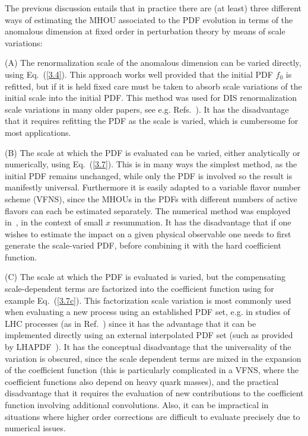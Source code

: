 The previous discussion entails that in practice there are
(at least) three different ways of estimating the MHOU associated
to the PDF evolution in terms of the anomalous dimension at fixed order in
perturbation theory by means of scale variations: 
\begin{description}
\item{(A)} The renormalization scale of the anomalous dimension can be
  varied directly, using Eq.~(\ref{3.4}).
  This approach works well provided that the
  initial PDF $f_0$ is refitted, but
  if it is held fixed care must be taken to absorb scale variations of
  the initial scale into the initial PDF.
  This method was used for DIS
  renormalization scale variations in many older papers, see
  e.g. Refs.~\cite{Martin:1990fq,Virchaux:1991jc,Ridolfi:1999vr}).
  It has the
  disadvantage that it requires refitting the PDF as the scale is varied,
  which is cumbersome for most applications.
  
\item{(B)} The scale at which the PDF is evaluated can be varied,
  either analytically or numerically, using Eq.~(\ref{3.7}). This is
  in many ways the simplest method, as the initial PDF remains
  unchanged, while only the PDF is involved so the result is
  manifestly universal.
%
  Furthermore it is easily adapted to a variable
  flavor number scheme (VFNS),
  since the MHOUs in the PDFs with different numbers of active
  flavors can each be estimated separately. The numerical method was
  employed in~\cite{Altarelli:2008aj}, in the context of small $x$
  resummation.
%
  It has the disadvantage that if one wishes to estimate
  the impact on a given physical observable one needs to first generate 
  the scale-varied PDF, before combining it with the hard coefficient function. 
\item{(C)} The scale at which the PDF is evaluated is varied, but the
  compensating scale-dependent terms are factorized into the
  coefficient function using for example Eq.~(\ref{3.7c}).
%
  This
  factorization scale variation is most commonly used when evaluating
  a new process using an established PDF set, e.g. in studies of LHC
  processes (as in Ref.~\cite{deFlorian:2016spz})
  since it has the
  advantage that it can be implemented directly using an external
  interpolated PDF set (such as provided by
  LHAPDF~\cite{Buckley:2014ana}).
  It has the conceptual disadvantage that the
  universality of the variation is obscured, since the scale dependent
  terms are mixed in the expansion of the coefficient function (this
  is particularly complicated  in a VFNS, where the coefficient functions
  also depend on heavy quark masses), and the practical disadvantage
  that it requires the evaluation of new contributions to the
  coefficient function involving additional convolutions. Also, it can be
  impractical in situations where higher order corrections are difficult 
  to evaluate precisely due to numerical issues.  
\end{description}

